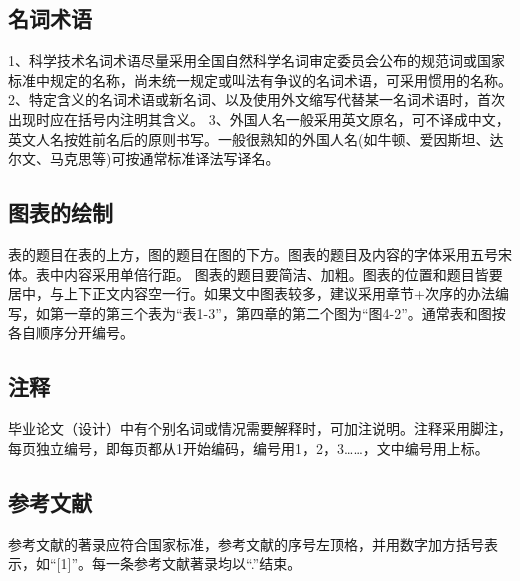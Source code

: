 \subsection{名词术语}
1、科学技术名词术语尽量采用全国自然科学名词审定委员会公布的规范词或国家标准中规定的名称，尚未统一规定或叫法有争议的名词术语，可采用惯用的名称。
2、特定含义的名词术语或新名词、以及使用外文缩写代替某一名词术语时，首次出现时应在括号内注明其含义。
3、外国人名一般采用英文原名，可不译成中文，英文人名按姓前名后的原则书写。一般很熟知的外国人名(如牛顿、爱因斯坦、达尔文、马克思等)可按通常标准译法写译名。

\subsection{图表的绘制}
表的题目在表的上方，图的题目在图的下方。图表的题目及内容的字体采用五号宋体。表中内容采用单倍行距。
图表的题目要简洁、加粗。图表的位置和题目皆要居中，与上下正文内容空一行。如果文中图表较多，建议采用章节+次序的办法编写，如第一章的第三个表为“表1-3”，第四章的第二个图为“图4-2”。通常表和图按各自顺序分开编号。

\subsection{注释}
毕业论文（设计）中有个别名词或情况需要解释时，可加注说明。注释采用脚注，每页独立编号，即每页都从1开始编码，编号用1，2，3……，文中编号用上标。

\subsection{参考文献}
参考文献的著录应符合国家标准，参考文献的序号左顶格，并用数字加方括号表示，如“[1]”。每一条参考文献著录均以“.”结束。

